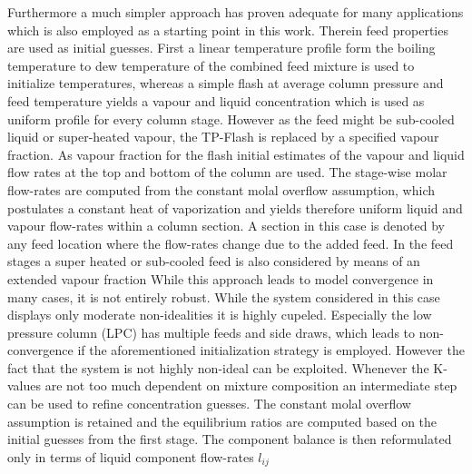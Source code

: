         Furthermore a much simpler approach has proven adequate for many applications \cite{Henley.op.2011}
        which is also employed as a starting point in this work.
        Therein feed properties are used as initial guesses. First a linear temperature profile form the boiling
        temperature to dew temperature of the combined feed mixture is used to initialize temperatures, whereas a simple flash
        at average column pressure and feed temperature yields a vapour and liquid concentration which is
        used as uniform profile for every column stage. However as the feed might be sub-cooled liquid or
        super-heated vapour, the TP-Flash is replaced by a specified vapour fraction. As vapour fraction
        for the flash initial estimates of the vapour and liquid flow rates at the top and bottom of the
        column are used. The stage-wise molar flow-rates are computed from the constant molal overflow
        assumption, which postulates a constant heat of vaporization and yields therefore uniform
        liquid and vapour flow-rates within a column section. A section in this case is denoted by any
        feed location where the flow-rates change due to the added feed. In the feed stages a super heated
        or sub-cooled feed is also considered by means of an extended vapour fraction
        While this approach leads to model convergence in many cases, it is not entirely robust.
        While the system considered in this case displays only moderate non-idealities it is highly cupeled.
        Especially the low pressure column (LPC) has multiple feeds and side draws, which leads to non-convergence
        if the aforementioned initialization strategy is employed. However the fact that the system is
        not highly non-ideal can be exploited. Whenever the K-values are not too much dependent on mixture
        composition an intermediate step can be used to refine concentration guesses. The constant molal
        overflow assumption is retained and the equilibrium ratios are computed based on the initial guesses
        from the first stage. The component balance is then reformulated only in terms of liquid component
        flow-rates $l_{ij}$

